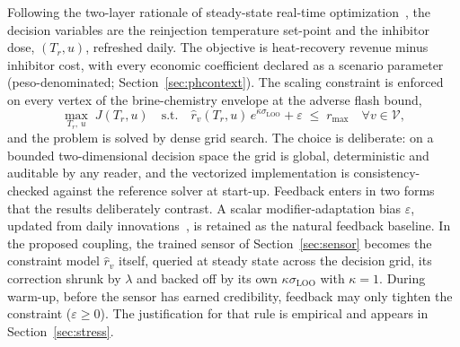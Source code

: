 Following the two-layer rationale of steady-state real-time
optimization~\citep{darby2011rto}, the decision variables are the
reinjection temperature set-point and the inhibitor dose, $(T_r, u)$,
refreshed daily. The objective is heat-recovery revenue minus inhibitor
cost, with every economic coefficient declared as a scenario parameter
(peso-denominated; Section~\ref{sec:phcontext}). The scaling constraint
is enforced on every vertex of the brine-chemistry envelope at the
adverse flash bound,
\begin{equation}\label{eq:rto}
\max_{T_r,\,u}\; J(T_r, u)
\quad \text{s.t.} \quad
\hat r_v(T_r, u)\, e^{\kappa \sigma_{\mathrm{LOO}}} + \varepsilon
\;\le\; r_{\max} \quad \forall v \in \mathcal{V},
\end{equation}
and the problem is solved by dense grid search. The choice is
deliberate: on a bounded two-dimensional decision space the grid is
global, deterministic and auditable by any reader, and the vectorized
implementation is consistency-checked against the reference solver at
start-up. Feedback enters in two forms that the results deliberately
contrast. A scalar modifier-adaptation bias $\varepsilon$, updated from
daily innovations~\citep{marchetti2009modifier,marchetti2010dual}, is
retained as the natural feedback baseline. In the proposed coupling,
the trained sensor of Section~\ref{sec:sensor} becomes the constraint
model $\hat r_v$ itself, queried at steady state across the decision
grid, its correction shrunk by $\lambda$ and backed off by its own
$\kappa\sigma_{\mathrm{LOO}}$ with $\kappa = 1$. During warm-up, before
the sensor has earned credibility, feedback may only tighten the
constraint ($\varepsilon \ge 0$). The justification for that rule is
empirical and appears in Section~\ref{sec:stress}.
